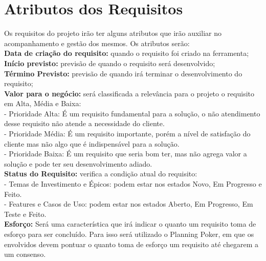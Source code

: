 \section{Atributos dos Requisitos}
Os requisitos do projeto irão ter alguns atributos que irão auxiliar no acompanhamento e gestão dos mesmos. Os atributos serão:\\
\tab \textbf{Data de criação do requisito:} quando o requisito foi criado na ferramenta;\\
\tab \textbf{Início previsto:} previsão de quando o requisito será desenvolvido;\\
\tab \textbf{Término Previsto:} previsão de quando irá terminar o desenvolvimento do requisito;\\
\tab \textbf{Valor para o negócio:} será classificada a relevância para o projeto o requisito em Alta, Média e Baixa:\\
\tab - Prioridade Alta: É um requisito fundamental para a solução, o não atendimento desse requisito não atende a necessidade do cliente.\\
\tab - Prioridade Média: É um requisito importante, porém a nível de satisfação do cliente mas não algo que é indispensável para a solução.\\
\tab - Prioridade Baixa: É um requisito que seria bom ter, mas não agrega valor a solução e pode ter seu desenvolvimento adiado.\\
\tab \textbf{Status do Requisito:} verifica a condição atual do requisito:\\
\tab - Temas de Investimento e Épicos: podem estar nos estados Novo, Em Progresso e Feito.\\
\tab - Features e Casos de Uso: podem estar nos estados Aberto, Em Progresso, Em Teste e Feito.\\
\tab \textbf{Esforço:} Será uma característica que irá indicar o quanto um requisito toma de esforço para ser concluído. Para isso será utilizado o Planning Poker, em que os envolvidos devem pontuar o quanto toma de esforço um requisito até chegarem a um consenso.\\
